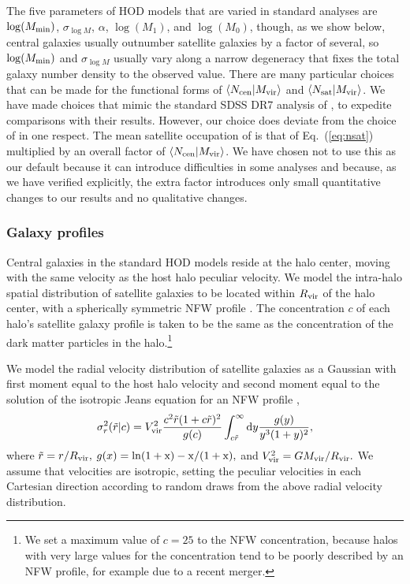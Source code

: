 \documentclass[usenatbib,usegraphicx,letterpaper]{mn2e}
\newcommand{\mvir}{M_{\rm vir}}
\newcommand{\rvir}{R_{\rm vir}}
\begin{document}
The five parameters of HOD models that are varied in standard analyses are $\log (M_{\rm min})$,
$\sigma_{\log M}$, $\alpha$, $\log (M_1)$, and $\log (M_0)$, though, as we show below, central galaxies usually
outnumber satellite galaxies by a factor of several, so $\log (M_{\rm min})$ and $\sigma_{\log M}$ usually
vary along a narrow degeneracy that fixes the total galaxy number density to the observed value. There are
many particular choices that can be made for the functional forms of $\langle N_{\rm cen}\vert \mvir \rangle$ and
$\langle N_{\rm sat}\vert \mvir \rangle$. We have made choices that mimic the standard SDSS DR7 analysis of
\citet{zehavi_etal11}, to expedite comparisons with their results. However, our choice does deviate from 
the choice of \citet{zehavi_etal11} in one respect. The mean satellite occupation of \citet{zehavi_etal11} 
is that of Eq.~(\ref{eq:nsat}) multiplied by an overall factor of $\langle N_{\rm cen} \vert \mvir \rangle$. 
We have chosen not to use this as our default because it can introduce difficulties in some analyses 
\citep[see the discussion of blue galaxy samples in][]{zentner_etal14} and because, as we have verified 
explicitly, the extra factor introduces only small quantitative changes to our results and no qualitative 
changes.


\subsubsection{Galaxy profiles}

Central galaxies in the standard HOD models reside at the halo center,
moving with the same velocity as the host halo peculiar velocity. We
model the intra-halo spatial distribution of satellite galaxies to be
located within $\rvir$ of the halo center, with a spherically
symmetric NFW profile \citep{nfw97}.  The concentration $c$ of each
halo's satellite galaxy profile is taken to be the same as the
concentration of the dark matter particles in the halo.\footnote{We
  set a maximum value of $c=25$ to the NFW concentration, because
  halos with very large values for the concentration tend to be poorly
  described by an NFW profile, for example due to a recent merger.}


We model the radial velocity distribution of satellite galaxies as a
Gaussian with first moment equal to the host halo velocity and second
moment equal to the solution of the isotropic Jeans equation for an
NFW profile \citep{more09b},
\begin{equation}
\sigma^{2}_{r}(\tilde{r}|c) = V_{\rm vir}^{2}\frac{c^{2}\tilde{r}(1 + c\tilde{r})^{2}}{g(c)}\int_{c\tilde{r}}^{\infty}{\rm d}y\frac{g(y)}{y^{3}(1 + y)^{2}},
\end{equation}
where $\tilde{r} = r/\rvir,$ $g(x) = \rm{ln}(1+x) - x / (1+x),$ and
$V_{\rm vir}^{2} = G\mvir/\rvir.$ We assume that velocities are
isotropic, setting the peculiar velocities in each Cartesian direction
according to random draws from the above radial velocity distribution.
\end{document}
